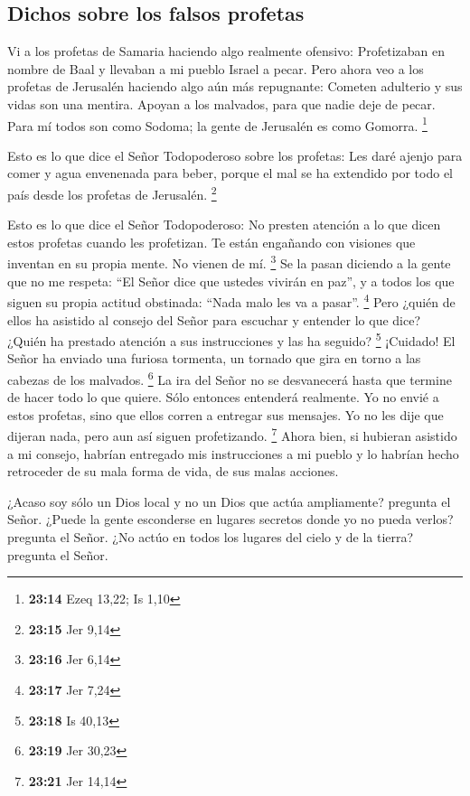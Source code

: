 \hypertarget{dichos-sobre-los-falsos-profetas}{%
\subsection{Dichos sobre los falsos
profetas}\label{dichos-sobre-los-falsos-profetas}}

 Vi a los profetas de Samaria haciendo algo realmente
ofensivo: Profetizaban en nombre de Baal y llevaban a mi pueblo Israel a
pecar.  Pero ahora veo a los profetas de Jerusalén
haciendo algo aún más repugnante: Cometen adulterio y sus vidas son una
mentira. Apoyan a los malvados, para que nadie deje de pecar. Para mí
todos son como Sodoma; la gente de Jerusalén es como Gomorra.
\footnote{\textbf{23:14} Ezeq 13,22; Is 1,10}

 Esto es lo que dice el Señor Todopoderoso sobre los
profetas: Les daré ajenjo para comer y agua envenenada para beber,
porque el mal se ha extendido por todo el país desde los profetas de
Jerusalén. \footnote{\textbf{23:15} Jer 9,14}

 Esto es lo que dice el Señor Todopoderoso: No presten
atención a lo que dicen estos profetas cuando les profetizan. Te están
engañando con visiones que inventan en su propia mente. No vienen de mí.
\footnote{\textbf{23:16} Jer 6,14}  Se la pasan diciendo
a la gente que no me respeta: ``El Señor dice que ustedes vivirán en
paz'', y a todos los que siguen su propia actitud obstinada: ``Nada malo
les va a pasar''. \footnote{\textbf{23:17} Jer 7,24} 
Pero ¿quién de ellos ha asistido al consejo del Señor para escuchar y
entender lo que dice? ¿Quién ha prestado atención a sus instrucciones y
las ha seguido? \footnote{\textbf{23:18} Is 40,13} 
¡Cuidado! El Señor ha enviado una furiosa tormenta, un tornado que gira
en torno a las cabezas de los malvados. \footnote{\textbf{23:19} Jer
  30,23}  La ira del Señor no se desvanecerá hasta que
termine de hacer todo lo que quiere. Sólo entonces entenderá realmente.
 Yo no envié a estos profetas, sino que ellos corren a
entregar sus mensajes. Yo no les dije que dijeran nada, pero aun así
siguen profetizando. \footnote{\textbf{23:21} Jer 14,14} 
Ahora bien, si hubieran asistido a mi consejo, habrían entregado mis
instrucciones a mi pueblo y lo habrían hecho retroceder de su mala forma
de vida, de sus malas acciones.

 ¿Acaso soy sólo un Dios local y no un Dios que actúa
ampliamente? pregunta el Señor.  ¿Puede la gente
esconderse en lugares secretos donde yo no pueda verlos? pregunta el
Señor. ¿No actúo en todos los lugares del cielo y de la tierra? pregunta
el Señor.

